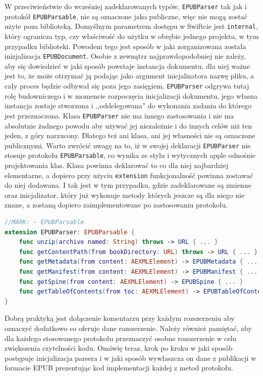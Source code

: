 W przeciwieństwie do wcześniej zadeklarowanych typów, \texttt{EPUBParser} tak jak i protokół \texttt{EPUBParsable}, nie są oznaczone jako publiczne, więc nie mogą zostać użyte poza biblioteką. Domyślnym parametrem dostępu w Swiftcie jest \texttt{internal}, który ogranicza typ, czy właściwość do użytku w obrębie jednego projektu, w tym przypadku biblioteki. Powodem tego jest sposób w jaki zorganizowana została inizjalizacja \texttt{EPUBDocument}. Osobie z zewnątrz najprawdopodobniej nie zależy, aby się dowiedzieć w jaki sposób powstaje instancja dokumentu, dla niej ważne jest to, że może otrzymać ją podając jako argument inicjalizatora nazwę pliku, a cały proces będzie odbywał się poza jego zasięgiem. \texttt{EPUBParser} odgrywa tutaj rolę budowniczego i w momencie rozpoczęcia inicjalizacji dokumentu, jego własna instancja zostaje stworzona i ,,oddelegowana'' do wykonania zadania do którego jest przeznaczona. Klasa \texttt{EPUBParser} nie ma innego zastosowania  i nie ma absolutnie żadnego powodu aby używać jej niezależnie i do innych celów niż ten jeden, z góry narzucony. Dlatego też ani klasa, ani jej własności nie są oznaczone publicznymi. Warto zwrócić uwagę na to, iż w swojej deklaracji \texttt{EPUBParser} nie stosuje protokołu \texttt{EPUBParsable}, co wynika ze stylu i wytycznych apple odnośnie projektowania klas. Klasa powinna deklarować to co dla niej najbardziej elementarne, a dopiero przy użyciu \texttt{extension} funkcjonalność powinna zostawać do niej dodawana. I tak jest w tym przypadku, gdzie zadeklarowane są zmienne oraz inicjalizator, który już wykonuje metody których jeszcze są dla niego nie znane, a zostaną dopiero zaimplementowane po zastosowaniu protokołu.

\begin{lstlisting}[firstnumber=30,caption={Klasa EPUBParser stosuje protokół EPUBParsable}, language=swift,label=awa]
//MARK: - EPUBParsable
extension EPUBParser: EPUBParsable {
    func unzip(archive named: String) throws -> URL { ... }
    func getContentPath(from bookDirectory: URL) throws -> URL { ... }
    func getMetadata(from content: AEXMLElement) -> EPUBMetadata { ... }
    func getManifest(from content: AEXMLElement) -> EPUBManifest { ... }
    func getSpine(from content: AEXMLElement) -> EPUBSpine { ... }
    func getTableOfContents(from toc: AEXMLElement) -> EPUBTableOfContents { ... }
}
\end{lstlisting}

Dobrą praktyką jest dołączenie komentarzu przy każdym rozszerzeniu aby oznaczyć dodatkowo co oferuje dane rozszerzenie. Należy również pamiętać, aby dla każdego stosowanego protokołu przeznaczyć osobne rozszerzenie w celu zwiększenia czytelności kodu. Omówię teraz, krok po kroku w jaki sposób postępuje inicjalizacja parsera i w jaki sposób wywłaszcza on dane z publikacji w formacie EPUB prezentując kod implementacji każdej z metod protokołu.

